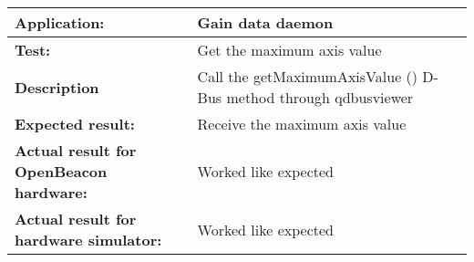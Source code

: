    \begin{tabular}{|p{3.5cm}|p{10.5cm}|}
    \hline
     \textbf{Application:}				& Gain data daemon\\
    \hline
     \textbf{Test:}					& Get the maximum axis value\\
    \hline
     \textbf{Description}				& Call the getMaximumAxisValue () D-Bus method through qdbusviewer\\
    \hline
     \textbf{Expected result:}				& Receive the maximum axis value\\
    \hline
     \textbf{Actual result for OpenBeacon hardware:}	& Worked like expected\\
    \hline
     \textbf{Actual result for hardware simulator:}	& Worked like expected\\
    \hline
   \end{tabular}

